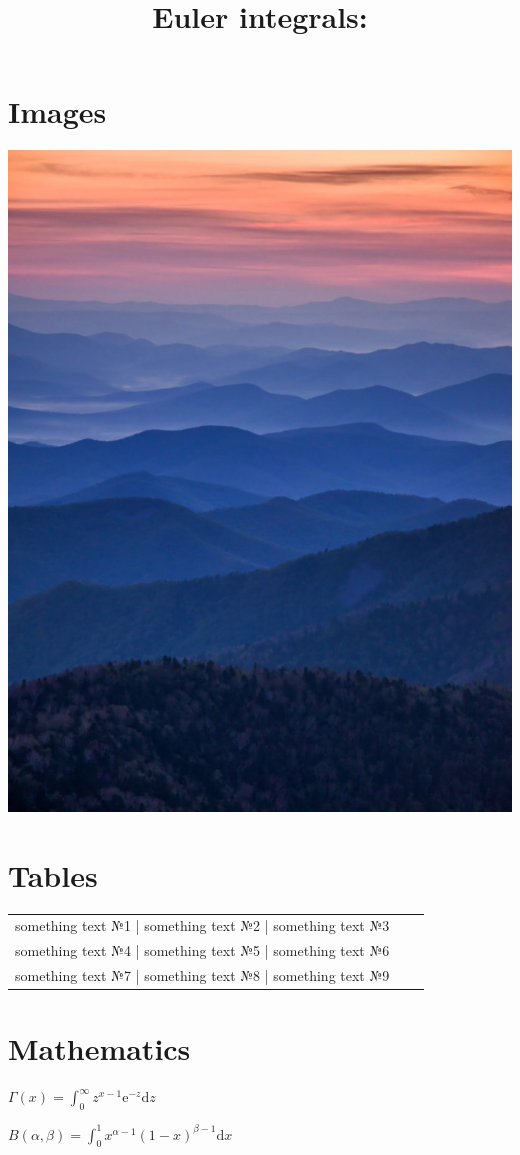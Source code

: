 \documentclass[a4paper, 12pt]{article} %
\begin{document}
\section{Images}

\includegraphics[scale=0.4]{photo}

\section{Tables}

\begin{center} %
    \begin{tabular}{ |c|c|c }
        \hline
        something text №1 | something text №2 | something text №3 \\
        something text №4 | something text №5 | something text №6 \\
        something text №7 | something text №8 | something text №9 \\
        \hline
    \end{tabular}
\end{center}

\section{Mathematics}

\title{Euler integrals:}

$\displaystyle\Gamma(x) = \int_{0}^{\infty} z^{x-1} \mathrm{e}^{-z} \mathrm{d}z$

$\displaystyle B(\alpha, \beta) = \int_{0}^{1} x^{\alpha - 1} (1 - x)^{\beta - 1}\mathrm{d}x$
\end{document}
